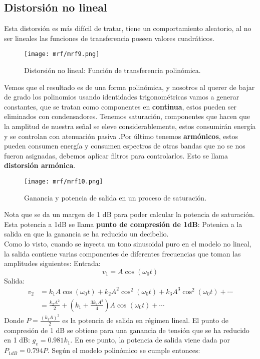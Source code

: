 \documentclass[
	12pt, %
	fleqn, %
	a4paper, %
	oneside, %
]{LegrandOrangeBook}
\begin{document}
\subsection{Distorsión no lineal}
Esta distorsión es más difícil de tratar, tiene un comportamiento aleatorio, al no ser lineales las funciones de transferencia poseen valores cuadráticos.
\begin{figure}[H]
\centering
\texttt{[image: mrf/mrf9.png]}
\caption{Distorsión no lineal: Función de transferencia polinómica.}
\end{figure}
Vemos que el resultado es de una forma polinómica, y nosotros al querer de bajar de grado los polinomios usando identidades trigonométricas vamos a generar constantes, que se tratan como componentes en \textbf{continua}, estos pueden ser eliminados con condensadores. Tenemos saturación, componentes que hacen que la amplitud de nuestra señal se eleve considerablemente, estos consumirán energía y se controlan con atenuación pasiva .Por último tenemos \textbf{armónicos}, estos pueden consumen energía y consumen espectros de otras bandas que no se nos fueron asignadas, debemos aplicar filtros para controlarlos. Esto se llama \textbf{distorsión armónica}.
\begin{figure}[H]
\centering
\texttt{[image: mrf/mrf10.png]}
\caption{Ganancia y potencia de salida en un proceso de saturación.}
\end{figure}
Nota que se da un margen de 1 dB para poder calcular la potencia de saturación. Esta potencia a 1dB se llama \textbf{punto de compresión de 1dB}: Potenica a la salida en que la ganancia se ha reducido un decibelio.\\
Como lo visto, cuando se inyecta un tono sinusoidal puro en el modelo no lineal, la salida contiene varias componentes de diferentes frecuencias que toman las amplitudes siguientes:
Entrada:
\begin{displaymath}
v_1=A\cos(\omega_0t)
\end{displaymath}
Salida:
\begin{align*}
v_2&=k_1A\cos(\omega_0t)+k_2A^2\cos^2(\omega_0t)+k_3A^3\cos^2(\omega_0t)+\cdots\\
&=\frac{k_2A^2}{2}+\left(k_1+\frac{3k_3A^2}{4}\right)A\cos(\omega_0t)+\cdots
\end{align*}
Donde $P=\frac{(k_1A)^2}{2}$ es la potencia de salida en régimen lineal. El punto de compresión de 1 dB se obtiene para una ganancia de tensión que se ha reducido en 1 dB: $g_v=0.981k_1$. En ese punto, la potencia de salida viene dada por $P_{1dB}=0.794P$. Según el modelo polinómico se cumple entonces:
\end{document}
